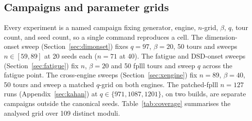 \documentclass[journal=cic,version=preprint]{iacrj}
\begin{document}
\subsection{Campaigns and parameter grids}
\label{sec:setup-campaigns}
Every experiment is a named campaign fixing
generator, engine, $n$-grid, $\beta$, $q$, tour count, and seed count, so a
single command reproduces a cell. The dimension-onset sweep
(Section~\ref{sec:dimonset}) fixes $q=97$, $\beta=20$, 50 tours and sweeps
$n\in[59,89]$ at 20 seeds each ($n=71$ at 40). The fatigue and DSD-onset sweeps
(Section~\ref{sec:fatigue}) fix $n$, $\beta=20$ and 50 fplll tours and sweep
$q$ across the fatigue point. The
cross-engine sweeps (Section~\ref{sec:xengine}) fix $n=89$, $\beta=40$, 50 tours
and sweep a matched $q$-grid on both engines. The patched-fplll $n=127$ runs
(Appendix~\ref{sec:kahan}) at $q\in\{971,1087,1201\}$, on two builds, are
separate campaigns outside the canonical seeds.
Table~\ref{tab:coverage} summarises the analysed grid over 109 distinct moduli.
\end{document}
